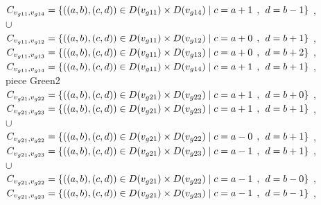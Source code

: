 \\$C_{v_{g11},v_{g14}}=\{((a,b),(c,d))\in D(v_{g11}) \times D(v_{g14})\mid c = a + 1\hspace{1ex} , \hspace{1ex}  d = b - 1 \}$ , 
\\$\cup$
\\$C_{v_{g11},v_{g12}}=\{((a,b),(c,d))\in D(v_{g11}) \times D(v_{g12})\mid c = a + 0\hspace{1ex} , \hspace{1ex}  d = b + 1 \}$ , 
\\$C_{v_{g11},v_{g13}}=\{((a,b),(c,d))\in D(v_{g11}) \times D(v_{g13})\mid c = a + 0\hspace{1ex} , \hspace{1ex}  d = b + 2 \}$ , 
\\$C_{v_{g11},v_{g14}}=\{((a,b),(c,d))\in D(v_{g11}) \times D(v_{g14})\mid c = a + 1\hspace{1ex} , \hspace{1ex}  d = b + 1 \}$ , 
\\ piece Green2 
\\$C_{v_{g21},v_{g22}}=\{((a,b),(c,d))\in D(v_{g21}) \times D(v_{g22})\mid c = a + 1\hspace{1ex} , \hspace{1ex}  d = b + 0 \}$ , 
\\$C_{v_{g21},v_{g23}}=\{((a,b),(c,d))\in D(v_{g21}) \times D(v_{g23})\mid c = a + 1\hspace{1ex} , \hspace{1ex}  d = b + 1 \}$ , 
\\$\cup$
\\$C_{v_{g21},v_{g22}}=\{((a,b),(c,d))\in D(v_{g21}) \times D(v_{g22})\mid c = a - 0\hspace{1ex} , \hspace{1ex}  d = b + 1 \}$ , 
\\$C_{v_{g21},v_{g23}}=\{((a,b),(c,d))\in D(v_{g21}) \times D(v_{g23})\mid c = a - 1\hspace{1ex} , \hspace{1ex}  d = b + 1 \}$ , 
\\$\cup$
\\$C_{v_{g21},v_{g22}}=\{((a,b),(c,d))\in D(v_{g21}) \times D(v_{g22})\mid c = a - 1\hspace{1ex} , \hspace{1ex}  d = b - 0 \}$ , 
\\$C_{v_{g21},v_{g23}}=\{((a,b),(c,d))\in D(v_{g21}) \times D(v_{g23})\mid c = a - 1\hspace{1ex} , \hspace{1ex}  d = b - 1 \}$ , 
